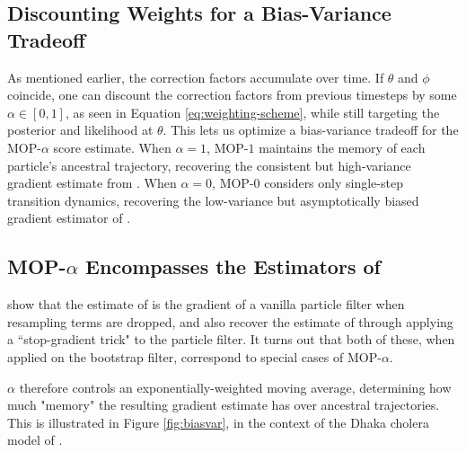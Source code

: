 \documentclass[9pt,twocolumn,twoside]{pnas-new}
\begin{document}
\subsection{Discounting Weights for a Bias-Variance Tradeoff}

As mentioned earlier, the correction factors accumulate over time. If $\theta$ and $\phi$ coincide, one can discount the correction factors from previous timesteps by some $\alpha \in [0,1]$, as seen in Equation \ref{eq:weighting-scheme}, while still targeting the posterior and likelihood at $\theta$. This lets us optimize a bias-variance tradeoff for the MOP-$\alpha$ score estimate. When $\alpha=1$, MOP-$1$ maintains the memory of each particle's ancestral trajectory, recovering the consistent but high-variance gradient estimate from \cite{poyiadjis11, scibior21}. When $\alpha=0$, MOP-$0$ considers only single-step transition dynamics, recovering the low-variance but asymptotically biased gradient estimator of \cite{naesseth18}. 


\subsection{MOP-$\alpha$ Encompasses the Estimators of \cite{poyiadjis11, scibior21, naesseth18}}

\cite{scibior21} show that the estimate of \cite{naesseth18} is the gradient of a vanilla particle filter when resampling terms are dropped, and also recover the estimate of \cite{poyiadjis11} through applying a ``stop-gradient trick" to the particle filter. It turns out that both of these, when applied on the bootstrap filter, correspond to special cases of MOP-$\alpha$.


$\alpha$ therefore controls an exponentially-weighted moving average, determining how much "memory" the resulting gradient estimate has over ancestral trajectories. This is illustrated in Figure \ref{fig:biasvar}, in the context of the Dhaka cholera model of \cite{king08}. 
\end{document}
